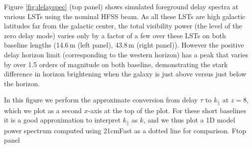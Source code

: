 \documentclass{emulateapj}
\begin{document}
Figure \ref{fig:delayspec} (top panel) shows simulated foreground delay spectra at various LSTs using the nominal HFSS beam. As all these LSTs are high galactic latitudes far from the galactic center, the total visibility power (the level of the zero delay mode) varies only by a factor of a few over these LSTs on both baseline lengths (14.6\,m (left panel), 43.8\,m (right panel)). However the positive delay horizon limit (corresponding to the western horizon) has a peak that varies by over 1.5 orders of magnitude on both baseline, demonstrating the stark difference in horizon brightening when the galaxy is just above versus just below the horizon. 

In this figure we perform the approximate conversion from delay $\tau$ to $k_\parallel$ at $z=8$, which we plot as a second $x$-axis at the top of the plot. For these short baselines it is a good approximation to interpret $k_\parallel$ as $k$, and we thus plot a 1D model power spectrum computed using 21cmFast \citep{21cmfast} as a dotted line for comparison. 
Ftop panel
\end{document}
